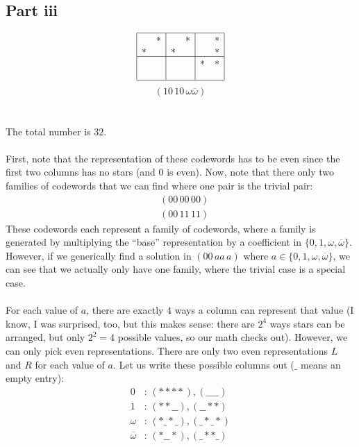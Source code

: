 \documentclass[letterpaper]{article}
\begin{document}
\subsection{Part iii}
\label{subs:5Partiii}

\[
\begin{array}{|c c|c c|c c|}
\hline
  & * &   & * &   & * \\
* &   & * &   &   & * \\
\hline
  &   &   &   & * & * \\
  &   &   &   &   &   \\
\hline
\end{array}
\]
\[
(1 0 \, 1 0 \, \omega \overline{\omega})
\]

\section{}
\label{sec:Question6}

The total number is $ 32 $.
\\ \\
First, note that the representation of these codewords has to be even since the first two columns has no stars (and $ 0 $ is even).
Now, note that there only two families of codewords that we can find where one pair is the trivial pair:
\begin{align}
    &(00\,00\,00) \\
    &(00\,11\,11)
\end{align}
These codewords each represent a family of codewords, where a family is generated by multiplying the ``base'' representation by a coefficient in $ \{0, 1, \omega, \overline{\omega} \} $.
However, if we generically find a solution in $ (00\,aa\,a) $ where $ a \in \{0, 1, \omega, \overline{\omega} \} $, we can see that we actually only have one family, where the trivial case is a special case.
\\ \\
For each value of $ a $, there are exactly $ 4 $ ways a column can represent that value (I know, I was surprised, too, but this makes sense: there are $ 2^{4} $ ways stars can be arranged, but only $ 2^2 = 4 $ possible values, so our math checks out).
However, we can only pick even representations.
There are only two even representations $ L $ and $ R $ for each value of $ a $.
Let us write these possible columns out ($ \_ $ means an empty entry):
\begin{align}
    0 &: \, (****), (\_\_\_\_) \\
    1 &: \, (**\_\_), (\_\_**) \\
    \omega &: \, (*\_*\_), (\_*\_*) \\
    \overline{\omega} &: \, (*\_\_*), (\_**\_)
\end{align}
\end{document}
